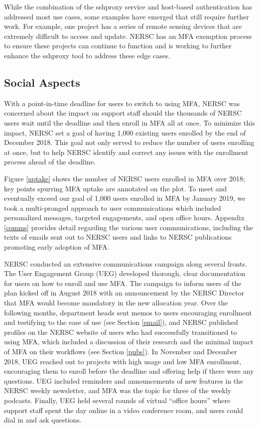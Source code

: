 \documentclass[sigconf,review]{acmart}
\begin{document}
While the combination of the sshproxy service and host-based authentication has
addressed most use cases, some examples have emerged that still require further
work.  For example, one project has a series of remote sensing devices that are
extremely difficult to access and update. NERSC has an MFA exemption
process to ensure these projects can continue to function and is working
to further enhance the sshproxy tool to address these edge cases.

\subsection{Social Aspects}
\label{social}

With a point-in-time deadline for users to switch to using MFA, NERSC was
concerned about the impact on support staff should the thousands of NERSC users
wait until the deadline and then enroll in MFA all at once. To minimize this
impact, NERSC set a goal of having 1,000 existing users enrolled by the end of
December 2018. This goal not only served to reduce the number of users enrolling
at once, but to help NERSC identify and correct any issues with the enrollment
process ahead of the deadline.

Figure \ref{uptake} shows the number of NERSC users enrolled in MFA over 2018;
key points spurring MFA uptake are annotated on the plot. To meet and eventually
exceed our goal of 1,000 users enrolled in MFA by January 2019, we took a
multi-pronged approach to user communications which included personalized messages,
targeted engagements, and open office hours. Appendix \ref{comms} provides
detail regarding the various user communications, including the texts of
emails sent out to NERSC users and links to NERSC publications promoting
early adoption of MFA.

NERSC conducted an extensive communications campaign along several fronts. The
User Engagement Group (UEG) developed thorough, clear documentation for users on
how to enroll and use MFA. The campaign to inform users of the plan kicked off
in August 2018 with an announcement by the NERSC Director that MFA would become
mandatory in the new allocation year. Over the following months, department heads
sent memos to users encouraging enrollment and testifying to the ease of use
(see Section \ref{email}),
and NERSC published profiles on the NERSC website of users who had successfully
transitioned to using MFA, which included a discussion of their research and the
minimal impact of MFA on their workflows (see Section \ref{pubs}).
In November and December 2018, UEG
reached out to projects with high usage and low MFA enrollment, encouraging them
to enroll before the deadline and offering help if there were any questions. UEG
included reminders and announcements of new features in the NERSC weekly
newsletter, and MFA was the topic for three of the weekly podcasts. Finally, UEG
held several rounds of virtual ``office hours'' where support staff spent the
day online in a video conference room, and users could dial in and ask
questions.
\end{document}
